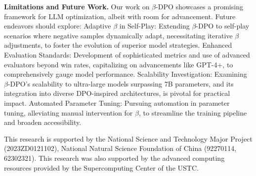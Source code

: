 \textbf{Limitations and Future Work.}
Our work on $\beta$-DPO showcases a promising framework for LLM optimization, albeit with room for advancement. Future endeavors should explore:
Adaptive $\beta$ in Self-Play: Extending $\beta$-DPO to self-play scenarios \cite{spin,sppo} where negative samples dynamically adapt, necessitating iterative $\beta$ adjustments, to foster the evolution of superior model strategies.
Enhanced Evaluation Standards: Development of sophisticated metrics and use of advanced evaluators beyond win rates, capitalizing on advancements like GPT-4+, to comprehensively gauge model performance.
Scalability Investigation: Examining $\beta$-DPO's scalability to ultra-large models surpassing 7B parameters, and its integration into diverse DPO-inspired architectures, is pivotal for practical impact.
Automated Parameter Tuning: Pursuing automation in parameter tuning, alleviating manual intervention for $\beta$, to streamline the training pipeline and broaden accessibility.
\begin{ack}
This research is supported by the National Science and Technology Major Project (2023ZD0121102), National Natural Science Foundation of China (92270114, 62302321). This research was also supported by the advanced computing resources provided by the Supercomputing Center of the USTC.
\end{ack}

\newpage

